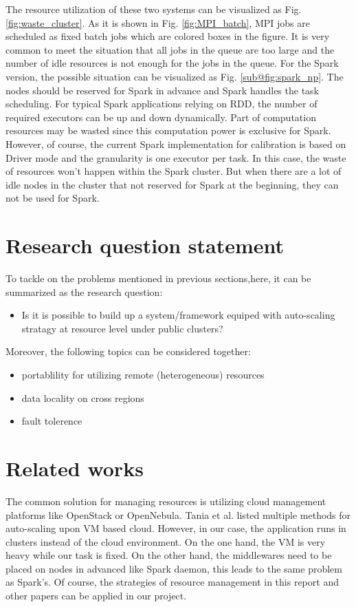 \documentclass[sigchi]{acmart}
\begin{document}
The resource utilization of these two systems can be visualized as Fig. \ref{fig:waste_cluster}. As it is shown in Fig. \ref{fig:MPI_batch}, MPI jobs are scheduled as fixed batch jobs which are colored boxes in the figure. It is very common to meet the situation that all jobs in the queue are too large and the number of idle resources is not enough for the jobs in the queue. 
For the Spark version, the possible situation can be visualized as Fig. \ref{sub@fig:spark_np}. The nodes should be reserved for Spark in advance and Spark handles the task scheduling. For typical Spark applications relying on RDD, the number of required executors can be up and down dynamically. Part of computation resources may be wasted since this computation power is exclusive for Spark.
However, of course, the current Spark implementation for calibration is based on Driver mode and the granularity is one executor per task. In this case, the waste of resources won't happen within the Spark cluster. But when there are a lot of idle nodes in the cluster that not reserved for Spark at the beginning, they can not be used for Spark. 


\section{Research question statement}
To tackle on the problems mentioned in previous sections,here, it can be summarized as the research question:
\begin{itemize}
    \item Is it is possible to build up a system/framework equiped with auto-scaling stratagy at resource level under public clusters?
\end{itemize}

Moreover, the following topics can be considered together:
\begin{itemize}
  \item portablility for utilizing remote (heterogeneous) resources
  \item data locality on cross regions 
  \item fault tolerence 
\end{itemize}

\section{Related works}
The common solution for managing resources is utilizing cloud management platforms like OpenStack or OpenNebula. 
Tania et al. \cite{Lorido-Botran2014} listed multiple methods for auto-scaling upon VM based cloud. However, in our case, the application runs in clusters instead of the cloud environment.
On the one hand, the VM is very heavy while our task is fixed. On the other hand, the middlewares need to be placed on nodes in advanced like Spark daemon, this leads to the same problem as Spark's.
Of course, the strategies of resource management in this report and other papers\cite{Kang2013}\cite{Mao2011} can be applied in our project. 
\end{document}
